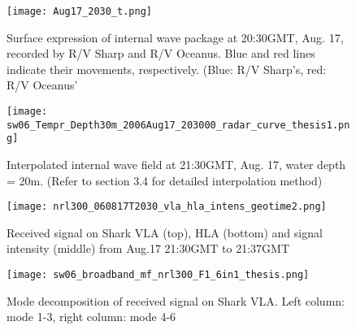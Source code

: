 

\begin{figure}[h]
  \centering
  \texttt{[image: Aug17\_2030\_t.png]}
  \caption{Surface expression of internal wave package at 20:30GMT, Aug. 17, recorded by R/V Sharp and R/V Oceanus. Blue and red lines indicate their movements, respectively. (Blue: R/V Sharp's, red: R/V Oceanus'}\label{fig:r2130_r}
\end{figure}

\begin{figure}[h]
  \centering
  \texttt{[image: sw06\_Tempr\_Depth30m\_2006Aug17\_203000\_radar\_curve\_thesis1.png]}
  \caption{Interpolated internal wave field at 21:30GMT, Aug. 17, water depth = 20m. (Refer to section 3.4 for detailed interpolation method)}\label{fig:r2130_i}
\end{figure}

\begin{figure}[h]
  \centering
  \texttt{[image: nrl300\_060817T2030\_vla\_hla\_intens\_geotime2.png]}
  \caption{Received signal on Shark VLA (top), HLA (bottom) and signal intensity (middle) from Aug.17 21:30GMT to 21:37GMT }\label{fig:a2130}
\end{figure}

\begin{figure}[h]
  \centering
  \texttt{[image: sw06\_broadband\_mf\_nrl300\_F1\_6in1\_thesis.png]}
  \caption{Mode decomposition of received signal on Shark VLA. 
    Left column: mode 1-3, right column: mode 4-6 }\label{fig:m2130}
\end{figure}

